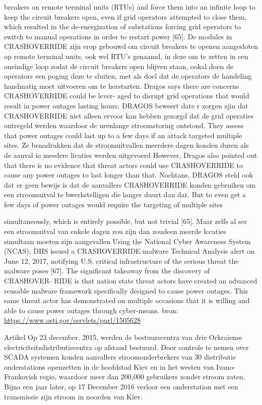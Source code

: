 		breakers on remote terminal units (RTUs) and force them into an infinite
		loop to keep the circuit breakers open, even if grid operators attempted
		to close them, which resulted in the de-energization of substations forcing
		grid operators to switch to manual operations in order to restart power
		[65]. De modules in CRASHOVERRIDE zijn erop gebouwd om circuit breakers te openen
		aangesloten op remote terminal units, ook wel RTU’s genaamd, in deze om te zetten in een
		oneindige loop zodat de circuit breakers open blijven staan, ookal doen de operators een
		poging deze te sluiten, met als doel dat de operators de handeling handmatig moet uitvoeren
		om te herstarten.
		Dragos says there are concerns CRASHOVERRIDE could be lever-
		aged to disrupt grid operations that would result in power outages lasting
		hours. DRAGOS beweert date r zorgen zjin dat CRASHOVERRIDE niet alleen ervoor kan
		hebben gezorgd dat de grid operaties ontregeld werden waardoor de urenlange
		stroomstoring ontstond.
		They assess that power outages could last up to a few days if an attack targeted multiple
		sites. Ze benadrukken dat de stroomuitvallen meerdere dagen konden duren als de aanval io
		meedere licaties werden uitgevoerd
		However, Dragos also pointed out that there is no evidence that threat actors could use
		CRASHOVERRIDE to cause any power outages to last longer than that. Nochtans,
		DRAGOS steld ook dat er geen bewijs is dat de aanvallers CRASHOVERRIDE konden
		gebruiken om een stroomuitval te bwerkstelligen die langer duurt dan dat.
		But to even get a few days of power outages would require the targeting of multiple sites
		
		simultaneously, which is entirely possible, but not trivial [65]. Maar zelfs al ser een
		stroomuitval van enkele dagen zou zijn dan zoudeen meerde lccaties simultaan moeten zijn
		aangevallen
		Using the National Cyber Awareness System (NCAS), DHS issued a
		CRASHOVERRIDE malware Technical Analysis alert on June 12, 2017, notifying U.S. critical
		infrastructure of the serious threat the malware poses [67].
		The significant takeaway from the discovery of CRASHOVER-
		RIDE is that nation state threat actors have created an advanced reusable
		malware framework specifically designed to cause power outages.
		This same threat actor has demonstrated on multiple occasions that it is willing and able to
		cause power outages through cyber-means.
		bron:
		\url{https://www.osti.gov/servlets/purl/1505628}
		
		Artikel
		Op 23 december, 2015, werden de bestuurscentra van drie Orkraiense electriciteitsdistributiecentra
		op afstand bestuurd. Door controle te nemen over SCADA systemen konden aanvallers
		stroomonderbrekers van 30 distributie onderstations openzetten in de hoofdstad Kiev en in het
		westen van Ivano-Frankovisk regio, waardoor meer dan 200,000 gebruikers zonder stroom zaten.
		Bijna een jaar later, op 17 December 2016 verloor een onderstation met een transmissie zijn stroom
		in noorden van Kiev.
		

